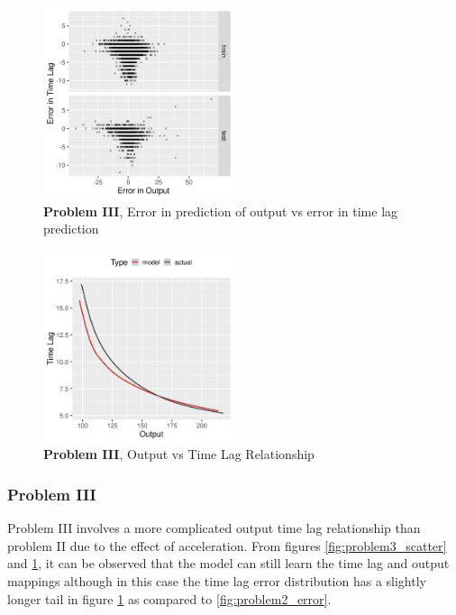 \documentclass[envcountsect,runningheads]{llncs}
\theoremstyle{etoile}
\begin{document}
\begin{figure}[h]
\vspace{.3in}
\centerline{\includegraphics[width=0.5\textwidth]{figures/exp3_scatter_errors.png}}
\vspace{.3in}
\caption{\textbf{Problem III}, Error in prediction of output vs error in time lag prediction}
\label{fig:problem3_error}
\end{figure}

\begin{figure}[h]
\vspace{.3in}
\centerline{\includegraphics[width=0.5\textwidth]{figures/exp3_predictive_curves.png}}
\vspace{.3in}
\caption{\textbf{Problem III}, Output vs Time Lag Relationship}
\label{fig:problem3_curves}
\end{figure}


\subsubsection{Problem III}

Problem III involves a more complicated output time lag relationship than problem II due to the 
effect of acceleration. From figures \ref{fig:problem3_scatter} and \ref{fig:problem3_error}, 
it can be observed that the model can still learn the time lag and output mappings although 
in this case the time lag error distribution has a slightly longer tail in figure 
\ref{fig:problem3_error} as compared to \ref{fig:problem2_error}.
\end{document}
